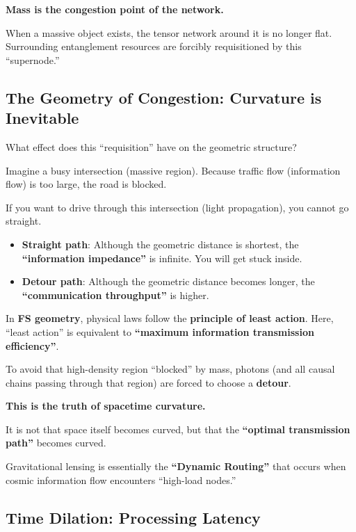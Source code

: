 \textbf{Mass is the congestion point of the network.}

When a massive object exists, the tensor network around it is no longer flat. Surrounding entanglement resources are forcibly requisitioned by this ``supernode.''

\subsection{The Geometry of Congestion: Curvature is Inevitable}

What effect does this ``requisition'' have on the geometric structure?

Imagine a busy intersection (massive region). Because traffic flow (information flow) is too large, the road is blocked.

If you want to drive through this intersection (light propagation), you cannot go straight.

\begin{itemize}
\item \textbf{Straight path}: Although the geometric distance is shortest, the \textbf{``information impedance''} is infinite. You will get stuck inside.

\item \textbf{Detour path}: Although the geometric distance becomes longer, the \textbf{``communication throughput''} is higher.
\end{itemize}

In \textbf{FS geometry}, physical laws follow the \textbf{principle of least action}. Here, ``least action'' is equivalent to \textbf{``maximum information transmission efficiency''}.

To avoid that high-density region ``blocked'' by mass, photons (and all causal chains passing through that region) are forced to choose a \textbf{detour}.

\textbf{This is the truth of spacetime curvature.}

It is not that space itself becomes curved, but that the \textbf{``optimal transmission path''} becomes curved.

Gravitational lensing is essentially the \textbf{``Dynamic Routing''} that occurs when cosmic information flow encounters ``high-load nodes.''

\subsection{Time Dilation: Processing Latency}

